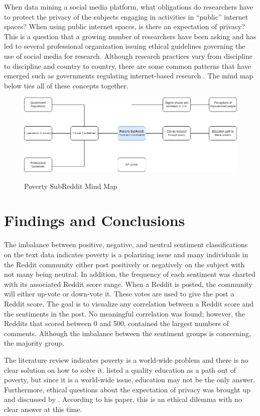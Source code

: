 \documentclass[stu,12pt,floatsintext]{apa7}
\begin{document}
\indent When data mining a social media platform, what obligations do researchers have to protect the privacy of the subjects engaging in activities in “public” internet spaces?  When using public internet spaces, is there an expectation of privacy?  This is a question that a growing number of researchers have been asking and has led to several professional organization issuing ethical guidelines governing the use of social media for research.  Although research practices vary from discipline to discipline and country to country, there are some common patterns that have emerged such as governments regulating internet-based research \citep{fiesler2024}.  The mind map below ties all of these concepts together.
\begin{figure}[H]
	\centering
	\caption{Poverty SubReddit Mind Map}
	\includegraphics[width=0.75\linewidth]{figures/mindMapPoverty.png}
	\label{fig:mind_map}
\end{figure}
\section{Findings and Conclusions}
\indent The imbalance between positive, negative, and neutral sentiment classifications on the text data indicates poverty is a polarizing issue and many individuals in the Reddit community either post positively or negatively on the subject with not many being neutral.  In addition, the frequency of each sentiment was charted with its associated Reddit score range.  When a Reddit is posted, the community will either up-vote or down-vote it.  These votes are used to give the post a Reddit score.  The goal is to visualize any correlation between a Reddit score and the sentiments in the post.  No meaningful correlation was found; however, the Reddits that scored between 0 and 500, contained the largest numbers of comments.  Although the imbalance between the sentiment groups is concerning, the majority group.

\indent The literature review indicates poverty is a world-wide problem and there is no clear solution on how to solve it.  \citet{tackie2021} listed a quality education as a path out of poverty, but since it is a world-wide issue, education may not be the only answer.  Furthermore, ethical questions about the expectation of privacy was brought up and discussed by \citet{fiesler2024}.  According to his paper, this is an ethical dilemma with no clear answer at this time.    

\end{document}
